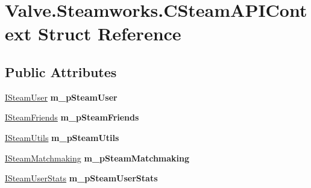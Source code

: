 \hypertarget{structValve_1_1Steamworks_1_1CSteamAPIContext}{}\section{Valve.\+Steamworks.\+C\+Steam\+A\+P\+I\+Context Struct Reference}
\label{structValve_1_1Steamworks_1_1CSteamAPIContext}
\subsection*{Public Attributes}
\begin{DoxyCompactItemize}
\item 
\hypertarget{structValve_1_1Steamworks_1_1CSteamAPIContext_a5d18883dd234b894dcc275c8766758c5}{}\hyperlink{classValve_1_1Steamworks_1_1ISteamUser}{I\+Steam\+User} {\bfseries m\+\_\+p\+Steam\+User}\label{structValve_1_1Steamworks_1_1CSteamAPIContext_a5d18883dd234b894dcc275c8766758c5}

\item 
\hypertarget{structValve_1_1Steamworks_1_1CSteamAPIContext_a27dad78c9784039c4d6eeadf9eb8bdcc}{}\hyperlink{classValve_1_1Steamworks_1_1ISteamFriends}{I\+Steam\+Friends} {\bfseries m\+\_\+p\+Steam\+Friends}\label{structValve_1_1Steamworks_1_1CSteamAPIContext_a27dad78c9784039c4d6eeadf9eb8bdcc}

\item 
\hypertarget{structValve_1_1Steamworks_1_1CSteamAPIContext_a6fbdf9bfdcee7726d83a4fe2ff29bd0e}{}\hyperlink{classValve_1_1Steamworks_1_1ISteamUtils}{I\+Steam\+Utils} {\bfseries m\+\_\+p\+Steam\+Utils}\label{structValve_1_1Steamworks_1_1CSteamAPIContext_a6fbdf9bfdcee7726d83a4fe2ff29bd0e}

\item 
\hypertarget{structValve_1_1Steamworks_1_1CSteamAPIContext_a1d67e062eefea56384c66c3714fd221e}{}\hyperlink{classValve_1_1Steamworks_1_1ISteamMatchmaking}{I\+Steam\+Matchmaking} {\bfseries m\+\_\+p\+Steam\+Matchmaking}\label{structValve_1_1Steamworks_1_1CSteamAPIContext_a1d67e062eefea56384c66c3714fd221e}

\item 
\hypertarget{structValve_1_1Steamworks_1_1CSteamAPIContext_a6933a727c38cc29abe4061e90a70c4f8}{}\hyperlink{classValve_1_1Steamworks_1_1ISteamUserStats}{I\+Steam\+User\+Stats} {\bfseries m\+\_\+p\+Steam\+User\+Stats}\label{structValve_1_1Steamworks_1_1CSteamAPIContext_a6933a727c38cc29abe4061e90a70c4f8}


\end{DoxyCompactItemize}
